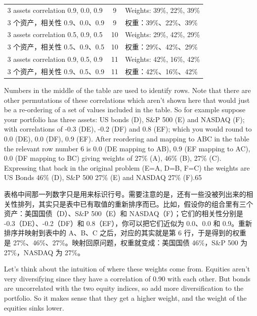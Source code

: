 \begin{bilingualtableblock}
\begin{tabularx}{\textwidth}{@{} L{0.38\textwidth} cY@{}}
3 assets correlation 0.9, 0.0, 0.9 & 9 & Weights: 39\%, 22\%, 39\% \\
3 个资产，相关性 0.9、0.0、0.9 & 9 & 权重：39\%、22\%、39\% \\
3 assets correlation 0.5, 0.9, 0.5 & 10 & Weights: 29\%, 42\%, 29\% \\
3 个资产，相关性 0.5、0.9、0.5 & 10 & 权重：29\%、42\%、29\% \\
3 assets correlation 0.9, 0.5, 0.9 & 11 & Weights: 42\%, 16\%, 42\% \\
3 个资产，相关性 0.9、0.5、0.9 & 11 & 权重：42\%、16\%、42\% \\
\bottomrule
\end{tabularx}
\par \endgroup \end{bilingualtableblock}

\begin{englishblock} Numbers in the middle of the table are used to identify rows. Note that there are other permutations of these correlations which aren’t shown here that would just be a re-ordering of a set of values included in the table. So for example suppose your portfolio has three assets: US bonds (D), S\&P 500 (E) and NASDAQ (F); with correlations of -0.3 (DE), -0.2 (DF) and 0.8 (EF); which you would round to 0.0 (DE), 0.0 (DF), 0.9 (EF). After reordering and mapping to ABC in the table the relevant row number 6 is 0.0 (DE mapping to AB), 0.9 (EF mapping to AC), 0.0 (DF mapping to BC) giving weights of 27\% (A), 46\% (B), 27\% (C). Expressing that back in the original problem (E=A, D=B, F=C) the weights are US Bonds 46\% (D), S\&P 500 27\% (E) and NASDAQ 27\% (F).65 \end{englishblock}

\begin{chineseblock}表格中间那一列数字只是用来标识行号。需要注意的是，还有一些没被列出来的相关性排列，其实只是表中已有取值的重新排序而已。比如，假设你的组合里有三个资产：美国国债（D）、S\&P 500（E）和 NASDAQ（F）；它们的相关性分别是 -0.3（DE）、-0.2（DF）和 0.8（EF），你可以把它们近似为 0.0、0.0 和 0.9。重新排序并映射到表中的 A、B、C 之后，对应的其实就是第 6 行，于是得到的权重是 27\%、46\%、27\%。映射回原问题，权重就变成：美国国债 46\%，S\&P 500 为 27\%，NASDAQ 为 27\%。 \end{chineseblock}

\bipairgap

\begin{englishblock} Let’s think about the intuition of where these weights come from. Equities aren’t very diversifying since they have a correlation of 0.90 with each other. But bonds are uncorrelated with the two equity indices, so add more diversification to the portfolio. So it makes sense that they get a higher weight, and the weight of the equities sinks lower. \end{englishblock}

